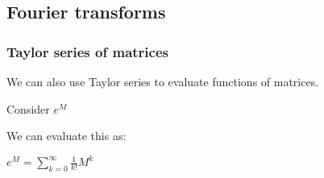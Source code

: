 
\subsection{Fourier transforms}

\subsubsection{Taylor series of matrices}

We can also use Taylor series to evaluate functions of matrices.

Consider \(e^M\)

We can evaluate this as:

\(e^M=\sum_{k=0}^\infty \frac{1}{k!}M^k\)

